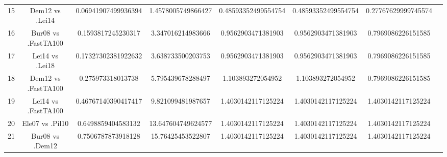 \documentclass[a4paper,10pt]{article}
\begin{document}
\begin{landscape}
\begin{table}[!htp]
\begin{tabular}{cccccccc}
15&Dem12 vs .Lei14&0.06941907499936394&1.4578005749866427&0.48593352499554754&0.48593352499554754&0.27767629999745574\\
16&Bur08 vs .FastTA100&0.1593817245230317&3.347016214983666&0.9562903471381903&0.9562903471381903&0.7969086226151585\\
17&Lei14 vs .Lei18&0.17327302381922632&3.638733500203753&0.9562903471381903&0.9562903471381903&0.7969086226151585\\
18&Dem12 vs .FastTA100&0.275973318013738&5.795439678288497&1.103893272054952&1.103893272054952&0.7969086226151585\\
19&Lei14 vs .FastTA100&0.46767140390417417&9.821099481987657&1.4030142117125224&1.4030142117125224&1.4030142117125224\\
20&Ele07 vs .Pil10&0.6498859404583132&13.647604749624577&1.4030142117125224&1.4030142117125224&1.4030142117125224\\
21&Bur08 vs .Dem12&0.7506787873918128&15.76425453522807&1.4030142117125224&1.4030142117125224&1.4030142117125224\\
\hline
\end{tabular}
\end{table}

\end{landscape}
\end{document}
